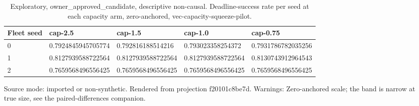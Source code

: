 {
\begin{table}[htbp]
\centering
\caption{Exploratory, owner\_approved\_candidate, descriptive non-causal. Deadline-success rate per seed at each capacity arm, zero-anchored, vec-capacity-squeeze-pilot.}
\label{tab:traffictwin-metrics-f20101c8be7d}
\small
\renewcommand{\arraystretch}{1.15}
\begin{tabular}{lllll}
\hline
Fleet seed & cap-2.5 & cap-1.5 & cap-1.0 & cap-0.75 \\
\hline
0 & 0.7924845945705774 & 0.792816188514216 & 0.793023358254372 & 0.7931786782035256 \\
1 & 0.8127939588722564 & 0.8127939588722564 & 0.8127939588722564 & 0.8130743912964543 \\
2 & 0.7659568496556425 & 0.7659568496556425 & 0.7659568496556425 & 0.7659568496556425 \\
\hline
\end{tabular}
\par\footnotesize
Source mode: imported or non-synthetic.
Rendered from projection f20101c8be7d.
 Warnings: Zero-anchored scale; the band is narrow at true size, see the paired-differences companion.
\end{table}
}
